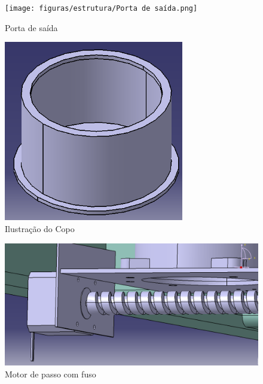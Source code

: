 \begin{apendicesenv}
\begin{figure}[H]
    \centering
    \texttt{[image: figuras/estrutura/Porta de saída.png]}
    \caption{Porta de saída}
    \label{fig:portas}
\end{figure}

\begin{figure}[H]
    \centering
    \includegraphics[width=0.7\textwidth]{figuras/estrutura/Copo.png}
    \caption{Ilustração do Copo}
    \label{fig:copos}
\end{figure}

\begin{figure}[H]
    \centering
    \includegraphics[width=1\textwidth]{figuras/estrutura/Motor de Passo no Fuso.png}
    \caption{Motor de passo com fuso}
    \label{fig:motordepassonofuso}
\end{figure}


\end{apendicesenv}
